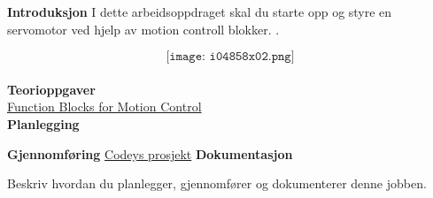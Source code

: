 

\noindent

\vskip 5pt


\textbf{Introduksjon}
I dette arbeidsoppdraget skal du starte opp og styre en servomotor ved hjelp av motion controll blokker. . 


$$\texttt{[image: i04858x02.png]}$$\\
\textbf{Teorioppgaver}\\

\href {https://plcopen.org/system/files/downloads/plcopen_motion_control_part_3_version_2.0.pdf}{Function Blocks for Motion Control}\\


\textbf{Planlegging}

\textbf{Gjennomføring}
\href{https://rfka-my.sharepoint.com/:f:/g/personal/fred-olav_mosdal_skole_rogfk_no/EjCt3CBy6hpFsAqgUV3o8sEBZpsutOKc0eHPvnmOe1rlhg?e=nI1x3c}{Codeys prosjekt}
\textbf{Dokumentasjon}

Beskriv hvordan du planlegger, gjennomfører og dokumenterer denne jobben. 
















\vfil \eject

















